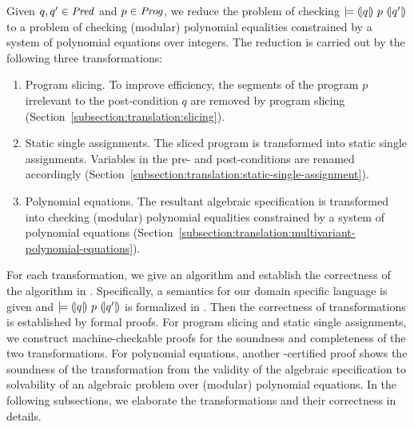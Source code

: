 
Given $q, q' \in \mathit{Pred}$ and $p \in \mathit{Prog}$, we reduce the problem of checking
$\models {(\!|}{q}{|\!)}~{p}~{(\!|}{q'}{|\!)}$ to a problem of checking (modular)
polynomial equalities constrained by a system of polynomial equations over
integers. The reduction is carried out by the following three
transformations:
\begin{enumerate}
\item Program slicing. To improve efficiency, the segments of the program $p$
  irrelevant to the post-condition $q$ are removed by program slicing 
  (Section~\ref{subsection:translation:slicing}). 
\item Static single assignments. The sliced program is transformed
  into static single assignments. Variables in the pre- and
  post-conditions are renamed accordingly
  (Section~\ref{subsection:translation:static-single-assignment}).
\item Polynomial equations. The resultant algebraic
  specification is transformed into checking (modular)
  polynomial equalities constrained by a system of polynomial equations
  (Section~\ref{subsection:translation:multivariant-polynomial-equations}).
\end{enumerate}

For each transformation, we give an algorithm and establish the
correctness of the algorithm in \coq. Specifically, a semantics
for our domain specific language is given and 
$\models {(\!|}{q}{|\!)}~{p}~{(\!|}{q'}{|\!)}$ is formalized in \coq. Then the
correctness of transformations is established by formal \coq
proofs. For program slicing and static single assignments, we
construct machine-checkable proofs for the soundness and completeness
of the two transformations. For polynomial equations, another
\coq-certified proof shows the soundness of the transformation
from the validity of the algebraic specification to solvability of an
algebraic problem over (modular) polynomial equations. In the
following subsections, we elaborate the transformations and their
correctness in details. 